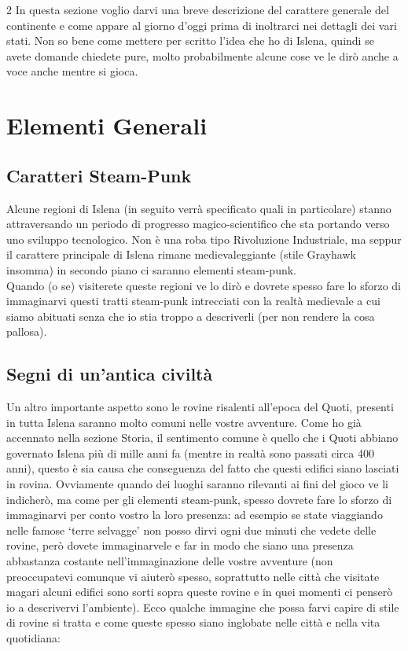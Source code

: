 \documentclass[10pt, a4paper]{report}
\begin{document}
\begin{multicols}{2}
In questa sezione voglio darvi una breve descrizione del carattere generale del continente e come appare al giorno d’oggi prima di inoltrarci nei dettagli dei vari stati. Non so bene come mettere per scritto l’idea che ho di Islena, quindi se avete domande chiedete pure, molto probabilmente alcune cose ve le dirò anche a voce anche mentre si gioca.

\section{Elementi Generali}
\subsection*{Caratteri Steam-Punk}
Alcune regioni di Islena (in seguito verrà specificato quali in particolare) stanno attraversando un periodo di progresso magico-scientifico che sta portando verso uno sviluppo tecnologico. Non è una roba tipo Rivoluzione Industriale, ma seppur il carattere principale di Islena rimane medievaleggiante (stile Grayhawk insomma) in secondo piano ci saranno elementi steam-punk.\\
Quando (o se) visiterete queste regioni ve lo dirò e dovrete spesso fare lo sforzo di immaginarvi questi tratti steam-punk intrecciati con la realtà medievale a cui siamo abituati senza che io stia troppo a descriverli (per non rendere la cosa pallosa).

\subsection*{Segni di un'antica civiltà}
Un altro importante aspetto sono le rovine risalenti all’epoca del Quoti, presenti in tutta Islena saranno molto comuni nelle vostre avventure. Come ho già accennato nella sezione Storia, il sentimento comune è quello che i Quoti abbiano governato Islena più di mille anni fa (mentre in realtà sono passati circa 400 anni), questo è sia causa che conseguenza del fatto che questi edifici siano lasciati in rovina. Ovviamente quando dei luoghi saranno rilevanti ai fini del gioco ve li indicherò, ma come per gli elementi steam-punk, spesso dovrete fare lo sforzo di immaginarvi per conto vostro la loro presenza: ad esempio se state viaggiando nelle famose \enquote*{terre selvagge} non posso dirvi ogni due minuti che vedete delle rovine, però dovete immaginarvele e far in modo che siano una presenza abbastanza costante nell’immaginazione delle vostre avventure (non preoccupatevi comunque vi aiuterò spesso, soprattutto nelle città che visitate magari alcuni edifici sono sorti sopra queste rovine e in quei momenti ci penserò io a descrivervi l’ambiente). Ecco qualche immagine che possa farvi capire di stile di rovine si tratta e come queste spesso siano inglobate nelle città e nella vita quotidiana:\\


\end{multicols}
\end{document}
